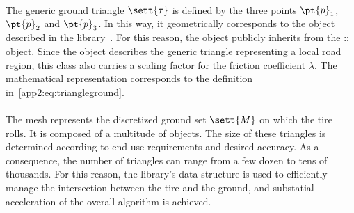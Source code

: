 \paragraph{\TriangleGround{}}
The generic ground triangle $\sett{\tau}$ is defined by the three points $\pt{p}_1$, $\pt{p}_2$ and $\pt{p}_3$. In this way, it geometrically corresponds to the \Triangle{} object described in the \Acme{} library~\cite{stocco2021acme}. For this reason, the \TriangleGround{} object publicly inherits from the \Acme{}::\Triangle{} object. Since the \TriangleGround{} object describes the generic triangle representing a local road region, this class also carries a scaling factor for the friction coefficient $\lambda$. The mathematical representation corresponds to the definition in~\eqref{app2:eq:triangleground}.

\paragraph{\Mesh{}}
The mesh represents the discretized ground set $\sett{M}$ on which the tire rolls. It is composed of a multitude of \TriangleGround{} objects. The size of these triangles is determined according to end-use requirements and desired accuracy. As a consequence, the number of triangles can range from a few dozen to tens of thousands.
For this reason, the \Acme{} library's \AabbTree{} data structure is used to efficiently manage the intersection between the tire and the ground, and substatial acceleration of the overall algorithm is achieved.

